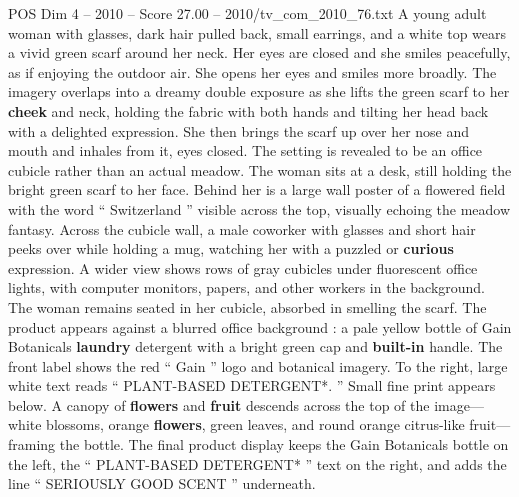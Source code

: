 \begin{textsample}{POS Dim 4 – 2010 – Score 27.00 – 2010/tv\_com\_2010\_76.txt}
A young adult woman with glasses, dark hair pulled back, small earrings, and a white top wears a vivid green scarf around her neck.
Her eyes are closed and she smiles peacefully, as if enjoying the outdoor air.
She opens her eyes and smiles more broadly.
The imagery overlaps into a dreamy double exposure as she lifts the green scarf to her \textbf{cheek} and neck, holding the fabric with both hands and tilting her head back with a delighted expression.
She then brings the scarf up over her nose and mouth and inhales from it, eyes closed.
The setting is revealed to be an office cubicle rather than an actual meadow.
The woman sits at a desk, still holding the bright green scarf to her face.
Behind her is a large wall poster of a flowered field with the word “ Switzerland ” visible across the top, visually echoing the meadow fantasy.
Across the cubicle wall, a male coworker with glasses and short hair peeks over while holding a mug, watching her with a puzzled or \textbf{curious} expression.
A wider view shows rows of gray cubicles under fluorescent office lights, with computer monitors, papers, and other workers in the background.
The woman remains seated in her cubicle, absorbed in smelling the scarf.
The product appears against a blurred office background : a pale yellow bottle of Gain Botanicals \textbf{laundry} detergent with a bright green cap and \textbf{built-in} handle.
The front label shows the red “ Gain ” logo and botanical imagery.
To the right, large white text reads “ PLANT-BASED DETERGENT*. ” Small fine print appears below.
A canopy of \textbf{flowers} and \textbf{fruit} descends across the top of the image—white blossoms, orange \textbf{flowers}, green leaves, and round orange citrus-like fruit—framing the bottle.
The final product display keeps the Gain Botanicals bottle on the left, the “ PLANT-BASED DETERGENT* ” text on the right, and adds the line “ SERIOUSLY GOOD SCENT ” underneath.

\end{textsample}
